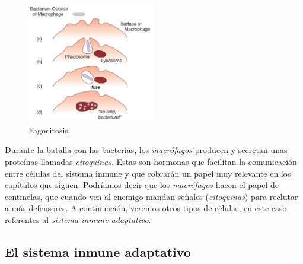 \begin{figure}[t]
	\centering
	\includegraphics[width=0.5\textwidth]{1_macrofago}
	\caption{Fagocitosis.}
	\label{fig:macrofago}
\end{figure}


Durante la batalla con las bacterias, los \textit{macrófagos} producen y secretan unas proteínas llamadas \textit{citoquinas}.
Estas son hormonas que facilitan la comunicación entre células del sistema inmune y que cobrarán un papel muy relevante en los capítulos que siguen.
Podríamos decir que los \textit{macrófagos} hacen el papel de centinelas, que cuando ven al enemigo mandan señales (\textit{citoquinas}) para reclutar a más defensores. A continuación, veremos otros tipos de células, en este caso referentes al \textit{sistema inmune adaptativo}.

\subsection{El sistema inmune adaptativo}


